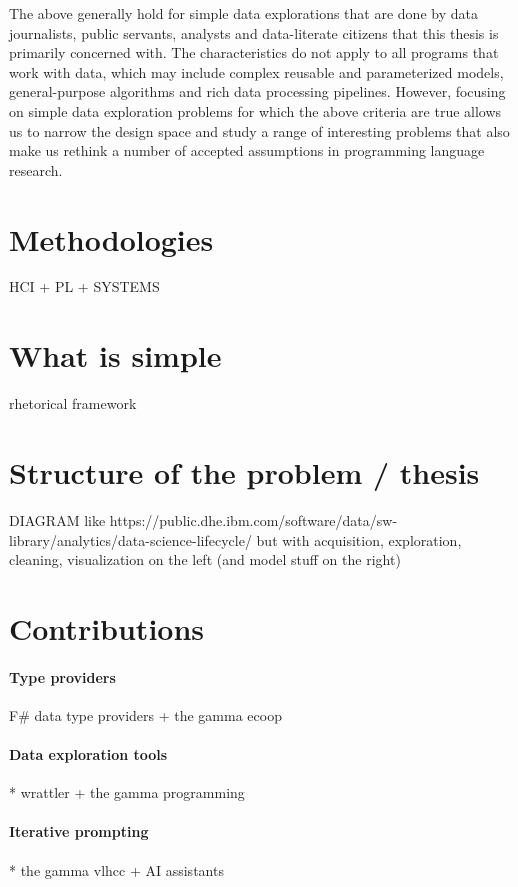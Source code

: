 \documentclass[fleqn,11pt]{report}
\begin{document}
The above generally hold for simple data explorations that are done by data journalists, public
servants, analysts and data-literate citizens that this thesis is primarily concerned with. The characteristics do not
apply to all programs that work with data, which may include complex reusable and parameterized
models, general-purpose algorithms and rich data processing pipelines. However, focusing on simple
data exploration problems for which the above criteria are true allows us to narrow the design
space and study a range of interesting problems that also make us rethink a number of accepted
assumptions in programming language research.

\section{Methodologies}

HCI + PL + SYSTEMS

\section{What is simple}

rhetorical framework

\section{Structure of the problem / thesis}

DIAGRAM
like https://public.dhe.ibm.com/software/data/sw-library/analytics/data-science-lifecycle/
but with acquisition, exploration, cleaning, visualization on the left
(and model stuff on the right)


\section{Contributions}

\paragraph{Type providers}
F\# data type providers + the gamma ecoop

\paragraph{Data exploration tools}
* wrattler + the gamma programming

\paragraph{Iterative prompting}
* the gamma vlhcc + AI assistants
\end{document}
